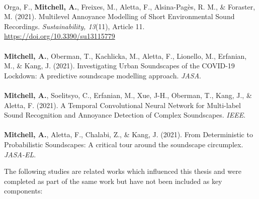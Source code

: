 \documentclass[oneside,fontsize=13pt,titlepage]{scrbook}
\begin{document}
\paragraph*{}
Orga, F., \textbf{Mitchell, A.}, Freixes, M., Aletta, F., Alsina-Pagès, R. M., \& Foraster, M. (2021). Multilevel Annoyance Modelling of Short Environmental Sound Recordings. \emph{Sustainability, 13}(11), Article 11. \url{https://doi.org/10.3390/su13115779}

\paragraph*{}
\textbf{Mitchell, A.}, Oberman, T., Kachlicka, M., Aletta, F., Lionello, M., Erfanian, M., \& Kang, J. (2021). Investigating Urban Soundscapes of the COVID-19 Lockdown: A predictive soundscape modelling approach. \emph{JASA}.

\paragraph*{}
\textbf{Mitchell, A.}, Soelitsyo, C., Erfanian, M., Xue, J-H., Oberman, T., Kang, J., \& Aletta, F. (2021). A Temporal Convolutional Neural Network for Multi-label Sound Recognition and Annoyance Detection of Complex Soundscapes. \emph{IEEE}.

\paragraph*{}
\textbf{Mitchell, A.}, Aletta, F., Chalabi, Z., \& Kang, J. (2021). From Deterministic to Probabilistic Soundscapes: A critical tour around the soundscape circumplex. \emph{JASA-EL}.




\newpage
The following studies are related works which influenced this thesis and were completed as part of the same work but have not been included as key components:

\end{document}
